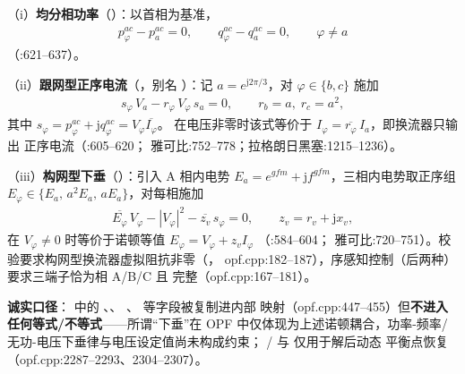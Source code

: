 （i）\textbf{均分相功率}（）：以首相为基准，
\begin{align*}
p^{ac}_{\varphi} - p^{ac}_{a} = 0,\qquad
q^{ac}_{\varphi} - q^{ac}_{a} = 0,\qquad \varphi\neq a
\end{align*}
（:621--637）。

（ii）\textbf{跟网型正序电流}（，别名
）：记 $a=e^{\mathrm{j}2\pi/3}$，对
$\varphi\in\{b,c\}$ 施加
\begin{align*}
s_{\varphi}\,V_a - r_{\varphi}\,V_{\varphi}\,s_a = 0,\qquad
r_b=a,\; r_c=a^{2},
\end{align*}
其中 $s_\varphi=p^{ac}_\varphi+\mathrm{j}q^{ac}_\varphi=V_\varphi\overline{I_\varphi}$。
在电压非零时该式等价于 $I_\varphi=\overline{r_\varphi}\,I_a$，即换流器只输出
正序电流（:605--620；
雅可比:752--778；拉格朗日黑塞:1215--1236）。

（iii）\textbf{构网型下垂}（）：引入 A 相内电势
$E_a=e^{gfm}+\mathrm{j}f^{gfm}$，三相内电势取正序组
$E_\varphi\in\{E_a,\,a^{2}E_a,\,aE_a\}$，对每相施加
\begin{align*}
\overline{E_\varphi}\,V_\varphi - |V_\varphi|^{2} - \overline{z_v}\,s_\varphi = 0,
\qquad z_v = r_v + \mathrm{j}x_v,
\end{align*}
在 $V_\varphi\neq 0$ 时等价于诺顿等值 $E_\varphi = V_\varphi + z_v I_\varphi$
（:584--604；
雅可比:720--751）。校验要求构网型换流器虚拟阻抗非零（，
opf.cpp:182--187），序感知控制（后两种）要求三端子恰为相 A/B/C 且
 完整（opf.cpp:167--181）。

\textbf{诚实口径}： 中的 、、
、 等字段被复制进内部
映射（opf.cpp:447--455）但\textbf{不进入任何等式/不等式}——所谓“下垂”在 OPF
中仅体现为上述诺顿耦合，功率-频率/无功-电压下垂律与电压设定值尚未构成约束；
/ 与  仅用于解后动态
平衡点恢复（opf.cpp:2287--2293、2304--2307）。

